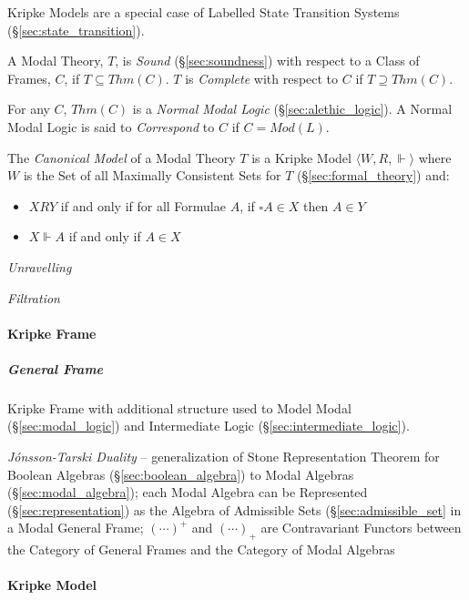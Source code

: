 Kripke Models are a special case of Labelled State Transition Systems
(\S\ref{sec:state_transition}).

A Modal Theory, $T$, is \emph{Sound} (\S\ref{sec:soundness}) with
respect to a Class of Frames, $C$, if $T \subseteq Thm(C)$. $T$ is
\emph{Complete} with respect to $C$ if $T \supseteq Thm(C)$.

For any $C$, $Thm(C)$ is a \emph{Normal Modal Logic}
(\S\ref{sec:alethic_logic}). A Normal Modal Logic is said to
\emph{Correspond} to $C$ if $C = Mod(L)$.

The \emph{Canonical Model} of a Modal Theory $T$ is a Kripke Model
$\langle W,R, \Vdash \rangle$ where $W$ is the Set of all Maximally
Consistent Sets for $T$ (\S\ref{sec:formal_theory}) and:
\begin{itemize}
\item $XRY$ if and only if for all Formulae $A$, if $\square A
  \in X$ then $A \in Y$
\item $X\Vdash A$ if and only if $A \in X$
\end{itemize}


\emph{Unravelling}

\emph{Filtration}



\paragraph{Kripke Frame}\label{sec:kripke_frame}\hfill

\subparagraph{General Frame}\label{sec:general_frame}\hfill

Kripke Frame with additional structure used to Model Modal
(\S\ref{sec:modal_logic}) and Intermediate Logic
(\S\ref{sec:intermediate_logic}).

\emph{J\'onsson-Tarski Duality} --
generalization of Stone Representation Theorem for Boolean Algebras
(\S\ref{sec:boolean_algebra}) to Modal Algebras (\S\ref{sec:modal_algebra});
each Modal Algebra can be Represented (\S\ref{sec:representation}) as the
Algebra of Admissible Sets (\S\ref{sec:admissible_set} in a Modal General Frame;
$(\cdots)^+$ and $(\cdots)_+$ are Contravariant Functors between the Category of
General Frames and the Category of Modal Algebras



\paragraph{Kripke Model}\label{sec:kripke_model}\hfill

